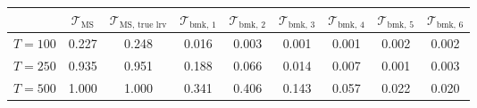 % 
\begin{tabular}{ccccccccc}
  \hline
  & $\mathcal{T}_{\text{MS}}$ & $\mathcal{T}_{\text{MS, true lrv}}$ & $\mathcal{T}_{\text{bmk, }1}$ & $\mathcal{T}_{\text{bmk, }2}$ & $\mathcal{T}_{\text{bmk, }3}$ & $\mathcal{T}_{\text{bmk, }4}$ & $\mathcal{T}_{\text{bmk, }5}$ & $\mathcal{T}_{\text{bmk, }6}$\\
 \hline
$T = 100$ & 0.227 & 0.248 & 0.016 & 0.003 & 0.001 & 0.001 & 0.002 & 0.002 \\ 
  $T = 250$ & 0.935 & 0.951 & 0.188 & 0.066 & 0.014 & 0.007 & 0.001 & 0.003 \\ 
  $T = 500$ & 1.000 & 1.000 & 0.341 & 0.406 & 0.143 & 0.057 & 0.022 & 0.020 \\ 
   \hline
\end{tabular}
